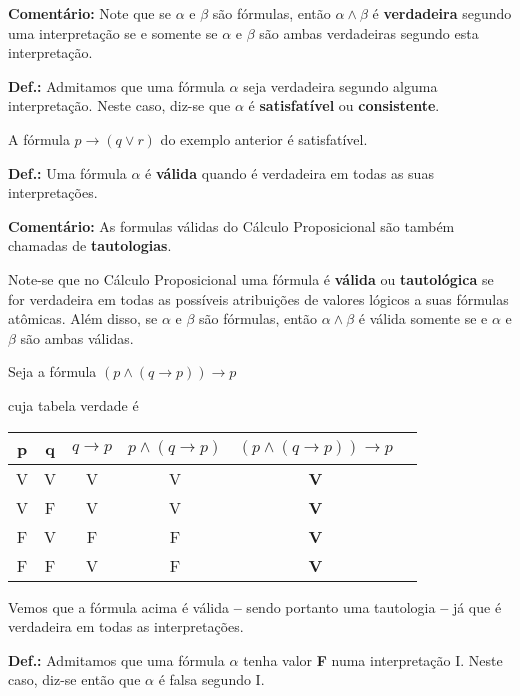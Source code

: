 \bigskip
\noindent
\textbf{Comentário:} Note que se $\alpha$ e $\beta$ são fórmulas, então $\alpha \land \beta$ é \textbf{verdadeira} segundo uma interpretação se e somente se $\alpha$ e $\beta$ são ambas verdadeiras segundo esta interpretação.

\bigskip
\noindent
\textbf{Def.:} Admitamos que uma fórmula $\alpha$ seja verdadeira segundo alguma interpretação.
Neste caso, diz-se que $\alpha$ é \textbf{satisfatível} ou \textbf{consistente}.

A fórmula $p \to (q \lor r)$ do exemplo anterior é satisfatível.


\bigskip
\noindent
\textbf{Def.:} Uma fórmula $\alpha$ é \textbf{válida} quando é verdadeira em todas as suas interpretações.

\bigskip
\noindent
\textbf{Comentário:} As formulas válidas do  Cálculo Proposicional são também chamadas de \textbf{tautologias}.

Note-se que no Cálculo Proposicional uma fórmula é \textbf{válida} ou \textbf{tautológica} se for verdadeira em todas as possíveis atribuições de valores lógicos a suas fórmulas atômicas.
Além disso, se $\alpha$ e $\beta$ são fórmulas, então $\alpha \land \beta$ é válida somente se e $\alpha$ e $\beta$ são ambas válidas.

\begin{exemplo}
    Seja a fórmula $(p \land (q \to p)) \to p$
\end{exemplo}
\noindent cuja tabela verdade é

\begin{center}
    \begin{tabular}{c c c c c c}
        p & q & $q \to p$ & $p \land (q \to p)$ & $(p \land (q \to p)) \to p$ \\ \hline
        V & V & V         & V                   & \textbf{V} \\
        V & F & V         & V                   & \textbf{V} \\
        F & V & F         & F                   & \textbf{V} \\
        F & F & V         & F                   & \textbf{V}
    \end{tabular}
\end{center}
Vemos que a fórmula acima é válida \textbf{--} sendo portanto uma tautologia \textbf{--} já que é verdadeira em todas as interpretações.

\bigskip
\noindent
\textbf{Def.:} Admitamos que uma fórmula $\alpha$ tenha valor \textbf{F} numa interpretação I.
Neste caso, diz-se então que $\alpha$ é falsa segundo I.


